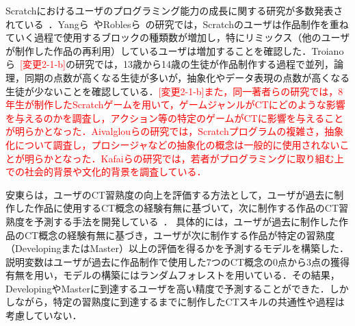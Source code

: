 \documentclass[submit]{ipsj}
\begin{document}

Scratchにおけるユーザのプログラミング能力の成長に関する研究が多数発表されている~\cite{Yang_2015}\cite{Troiano_2019}\cite{Ando_2021}\cite{Troiano_2019-2}\cite{ICSE16_Aivalglou}\cite{OEUC10-Kafai}\cite{Troiano_2020}．Yangら~\cite{Yang_2015}やRoblesら~\cite{Robles_2017}の研究では，Scratchのユーザは作品制作を重ねていく過程で使用するブロックの種類数が増加し，特にリミックス（他のユーザが制作した作品の再利用）しているユーザは増加することを確認した．Troianoら~\cite{Troiano_2019}\textcolor{red}{[変更2-1-b]\cite{Troiano_2019-2}}の研究では，13歳から14歳の生徒が作品制作する過程で並列，論理，同期の点数が高くなる生徒が多いが，抽象化やデータ表現の点数が高くなる生徒が少ないことを確認している．\textcolor{red}{[変更2-1-b]また，同一著者らの\cite{Troiano_2020}研究では，8年生が制作したScratchゲームを用いて，ゲームジャンルがCTにどのような影響を与えるのかを調査し，アクション等の特定のゲームがCTに影響を与えることが明らかとなった．Aivalglouら\cite{ICSE16_Aivalglou}の研究では，Scratchプログラムの複雑さ，抽象化について調査し，プロシージャなどの抽象化の概念は一般的に使用されないことが明らかとなった．Kafaiら\cite{OEUC10-Kafai}の研究では，若者がプログラミングに取り組む上での社会的背景や文化的背景を調査している．}

安東らは，ユーザのCT習熟度の向上を評価する方法として，ユーザが過去に制作した作品に使用するCT概念の経験有無に基づいて，次に制作する作品のCT習熟度を予測する手法を開発している~\cite{Ando_2021}．%
具体的には，ユーザが過去に制作した作品のCT概念の経験有無に基づき，ユーザが次に制作する作品が特定の習熟度（DevelopingまたはMaster）以上の評価を得るかを予測するモデルを構築した．説明変数はユーザが過去に作品制作で使用した7つのCT概念の0点から3点の獲得有無を用い，モデルの構築にはランダムフォレストを用いている．その結果，DevelopingやMasterに到達するユーザを高い精度で予測することができた．しかしながら，特定の習熟度に到達するまでに制作したCTスキルの共通性や過程は考慮していない．
\end{document}
